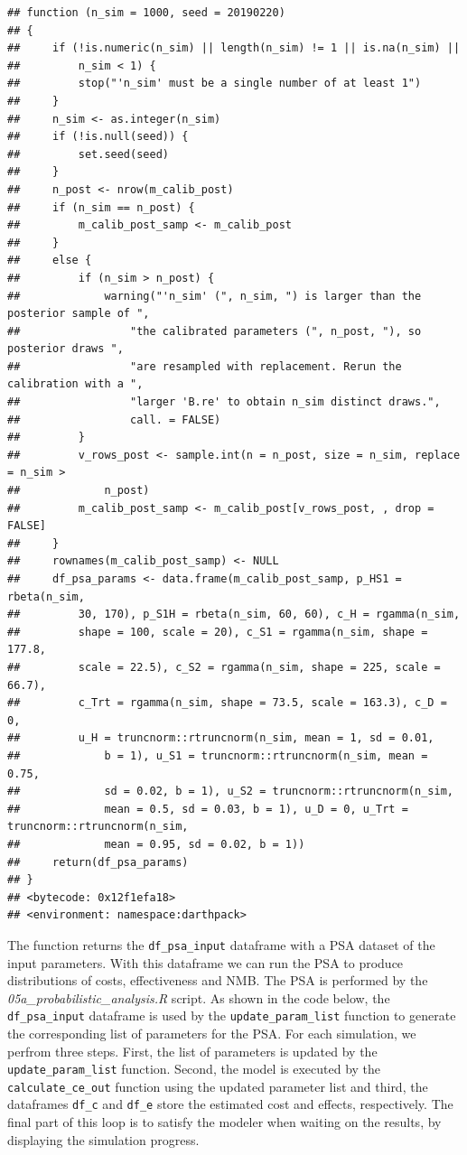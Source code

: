 \documentclass[
]{book}
\begin{document}
\begin{verbatim}
## function (n_sim = 1000, seed = 20190220) 
## {
##     if (!is.numeric(n_sim) || length(n_sim) != 1 || is.na(n_sim) || 
##         n_sim < 1) {
##         stop("'n_sim' must be a single number of at least 1")
##     }
##     n_sim <- as.integer(n_sim)
##     if (!is.null(seed)) {
##         set.seed(seed)
##     }
##     n_post <- nrow(m_calib_post)
##     if (n_sim == n_post) {
##         m_calib_post_samp <- m_calib_post
##     }
##     else {
##         if (n_sim > n_post) {
##             warning("'n_sim' (", n_sim, ") is larger than the posterior sample of ", 
##                 "the calibrated parameters (", n_post, "), so posterior draws ", 
##                 "are resampled with replacement. Rerun the calibration with a ", 
##                 "larger 'B.re' to obtain n_sim distinct draws.", 
##                 call. = FALSE)
##         }
##         v_rows_post <- sample.int(n = n_post, size = n_sim, replace = n_sim > 
##             n_post)
##         m_calib_post_samp <- m_calib_post[v_rows_post, , drop = FALSE]
##     }
##     rownames(m_calib_post_samp) <- NULL
##     df_psa_params <- data.frame(m_calib_post_samp, p_HS1 = rbeta(n_sim, 
##         30, 170), p_S1H = rbeta(n_sim, 60, 60), c_H = rgamma(n_sim, 
##         shape = 100, scale = 20), c_S1 = rgamma(n_sim, shape = 177.8, 
##         scale = 22.5), c_S2 = rgamma(n_sim, shape = 225, scale = 66.7), 
##         c_Trt = rgamma(n_sim, shape = 73.5, scale = 163.3), c_D = 0, 
##         u_H = truncnorm::rtruncnorm(n_sim, mean = 1, sd = 0.01, 
##             b = 1), u_S1 = truncnorm::rtruncnorm(n_sim, mean = 0.75, 
##             sd = 0.02, b = 1), u_S2 = truncnorm::rtruncnorm(n_sim, 
##             mean = 0.5, sd = 0.03, b = 1), u_D = 0, u_Trt = truncnorm::rtruncnorm(n_sim, 
##             mean = 0.95, sd = 0.02, b = 1))
##     return(df_psa_params)
## }
## <bytecode: 0x12f1efa18>
## <environment: namespace:darthpack>
\end{verbatim}

The function returns the \texttt{df\_psa\_input} dataframe with a PSA dataset of the input parameters. With this dataframe we can run the PSA to produce distributions of costs, effectiveness and NMB. The PSA is performed by the \emph{05a\_probabilistic\_analysis.R} script. As shown in the code below, the \texttt{df\_psa\_input} dataframe is used by the \texttt{update\_param\_list} function to generate the corresponding list of parameters for the PSA. For each simulation, we perfrom three steps. First, the list of parameters is updated by the \texttt{update\_param\_list} function. Second, the model is executed by the \texttt{calculate\_ce\_out} function using the updated parameter list and third, the dataframes \texttt{df\_c} and \texttt{df\_e} store the estimated cost and effects, respectively. The final part of this loop is to satisfy the modeler when waiting on the results, by displaying the simulation progress.
\end{document}
